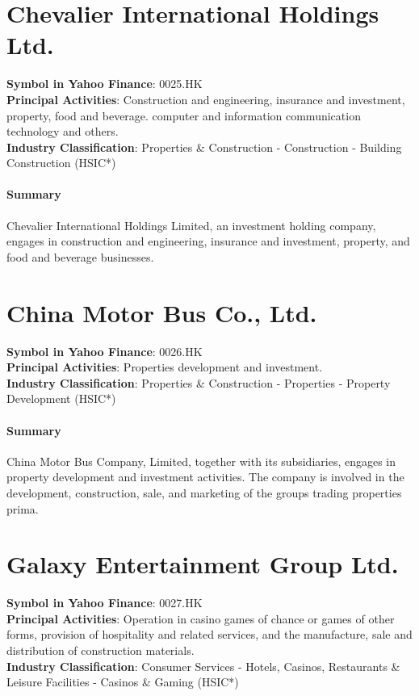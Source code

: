 \section{Chevalier International Holdings Ltd.}
\textbf{Symbol in Yahoo Finance}: 0025.HK\\
\textbf{Principal Activities}: Construction and engineering, insurance and investment, property, food and beverage. computer and information communication technology and others.\\
\textbf{Industry Classification}: Properties \& Construction - Construction - Building Construction (HSIC*)
\paragraph{Summary}
Chevalier International Holdings Limited, an investment holding company, engages in construction and engineering, insurance and investment, property, and food and beverage businesses.


\section{China Motor Bus Co., Ltd.}
\textbf{Symbol in Yahoo Finance}: 0026.HK\\
\textbf{Principal Activities}: Properties development and investment.\\
\textbf{Industry Classification}: Properties \& Construction - Properties - Property Development (HSIC*)
\paragraph{Summary}
China Motor Bus Company, Limited, together with its subsidiaries, engages in property development and investment activities. The company is involved in the development, construction, sale, and marketing of the groups trading properties prima.


\section{Galaxy Entertainment Group Ltd.}
\textbf{Symbol in Yahoo Finance}: 0027.HK\\
\textbf{Principal Activities}: Operation in casino games of chance or games of other forms, provision of hospitality and related services, and the manufacture, sale and distribution of construction materials.\\
\textbf{Industry Classification}: Consumer Services - Hotels, Casinos, Restaurants \& Leisure Facilities - Casinos \& Gaming (HSIC*)

